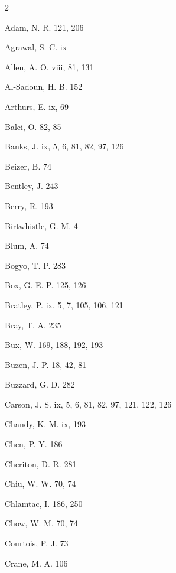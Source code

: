 \providecommand{\ManualAuthorIndex}{\noindent{\sffamily\bfseries\Large Author Index}\par\medskip}
\providecommand{\ManualSubjectIndex}{\noindent{\sffamily\bfseries\Large Subject Index}\par\medskip}
\begingroup
\setlength{\columnsep}{1.5em}
\fontsize{8}{9.1}\selectfont
\setlength{\parindent}{0pt}
\begin{multicols}{2}
\ManualAuthorIndex
\noindent Adam, N. R. 121, 206\par
\noindent Agrawal, S. C. ix\par
\noindent Allen, A. O. viii, 81, 131\par
\noindent Al-Sadoun, H. B. 152\par
\noindent Arthurs, E. ix, 69\par
\noindent Balci, O. 82, 85\par
\noindent Banks, J. ix, 5, 6, 81, 82, 97, 126\par
\noindent Beizer, B. 74\par
\noindent Bentley, J. 243\par
\noindent Berry, R. 193\par
\noindent Birtwhistle, G. M. 4\par
\noindent Blum, A. 74\par
\noindent Bogyo, T. P. 283\par
\noindent Box, G. E. P. 125, 126\par
\noindent Bratley, P. ix, 5, 7, 105, 106, 121\par
\noindent Bray, T. A. 235\par
\noindent Bux, W. 169, 188, 192, 193\par
\noindent Buzen, J. P. 18, 42, 81\par
\noindent Buzzard, G. D. 282\par
\noindent Carson, J. S. ix, 5, 6, 81, 82, 97, 121, 122, 126\par
\noindent Chandy, K. M. ix, 193\par
\noindent Chen, P.-Y. 186\par
\noindent Cheriton, D. R. 281\par
\noindent Chiu, W. W. 70, 74\par
\noindent Chlamtac, I. 186, 250\par
\noindent Chow, W. M. 70, 74\par
\noindent Courtois, P. J. 73\par
\noindent Crane, M. A. 106\par

\end{multicols}
